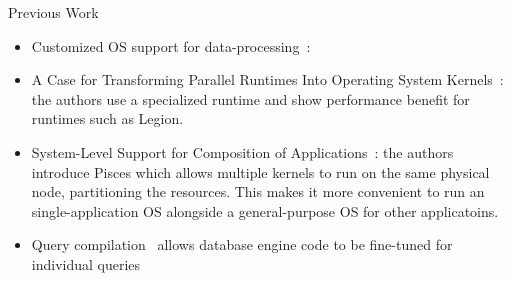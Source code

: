 \begin{block}{Previous Work}
  \begin{itemize}
      \item Customized OS support for data-processing~\cite{GICEVA:2016:OS_SUPPORT}: 
      \item A Case for Transforming Parallel Runtimes Into Operating System Kernels~\cite{HALE:2015:NAUTILUS}: the authors use a specialized runtime and show performance benefit for runtimes such as Legion.
      \item System-Level Support for Composition of Applications~\cite{KOCOLOSKI:2015:PISCES}: the authors introduce Pisces which allows multiple kernels to run on the same physical node, partitioning the resources. This makes it more convenient to run an single-application OS alongside a general-purpose OS for other applicatoins.
  \item Query compilation~\cite{SK16,N11} allows database engine code to be fine-tuned for individual queries
  \end{itemize}
  
\end{block}
